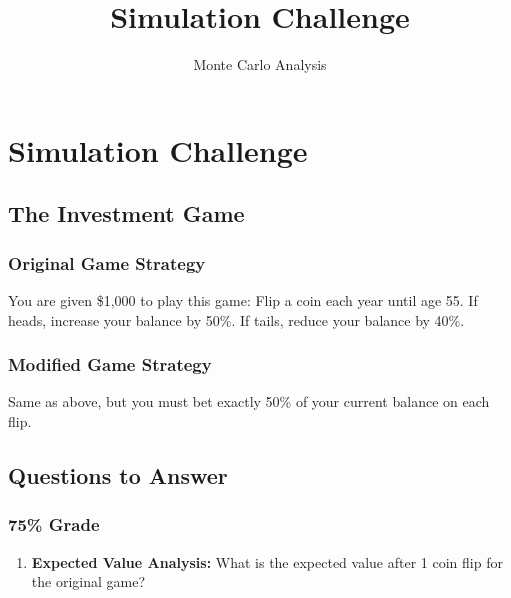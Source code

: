 \documentclass[
  letterpaper,
  DIV=11,
  numbers=noendperiod]{scrartcl}
\title{Simulation Challenge}
\subtitle{Monte Carlo Analysis}
\author{}
\date{}
\providecommand{\tightlist}{%
  \setlength{\itemsep}{0pt}\setlength{\parskip}{0pt}}
\begin{document}
\maketitle


\section{Simulation Challenge}\label{simulation-challenge}

\subsection{The Investment Game}\label{the-investment-game}

\subsubsection{Original Game Strategy}\label{original-game-strategy}

You are given \$1,000 to play this game: Flip a coin each year until age
55. If heads, increase your balance by 50\%. If tails, reduce your
balance by 40\%.

\subsubsection{Modified Game Strategy}\label{modified-game-strategy}

Same as above, but you must bet exactly 50\% of your current balance on
each flip.

\subsection{Questions to Answer}\label{questions-to-answer}

\subsubsection{75\% Grade}\label{grade}

\begin{enumerate}
\def\labelenumi{\arabic{enumi}.}
\tightlist
\item
  \textbf{Expected Value Analysis:} What is the expected value after 1
  coin flip for the original game?
\end{enumerate}
\end{document}
